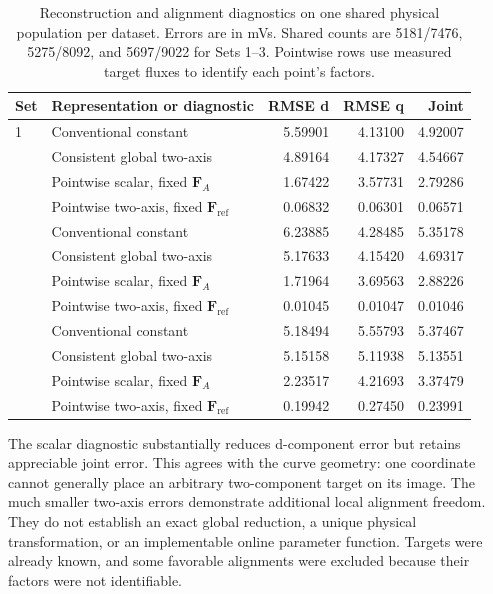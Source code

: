 \begin{table}[htbp]
\centering\small
\caption{Reconstruction and alignment diagnostics on one shared physical population per dataset. Errors are in mVs. Shared counts are 5181/7476, 5275/8092, and 5697/9022 for Sets 1--3. Pointwise rows use measured target fluxes to identify each point's factors.}
\label{tab:pointwise-comparison}
\begin{tabular}{llrrr}
\toprule
Set & Representation or diagnostic & RMSE d & RMSE q & Joint\\
\midrule
1 & Conventional constant & 5.59901 & 4.13100 & 4.92007\\
  & Consistent global two-axis & 4.89164 & 4.17327 & 4.54667\\
  & Pointwise scalar, fixed $\bm F_A$ & 1.67422 & 3.57731 & 2.79286\\
  & Pointwise two-axis, fixed $\bm F_{\mathrm{ref}}$ & 0.06832 & 0.06301 & 0.06571\\
\addlinespace
2 & Conventional constant & 6.23885 & 4.28485 & 5.35178\\
  & Consistent global two-axis & 5.17633 & 4.15420 & 4.69317\\
  & Pointwise scalar, fixed $\bm F_A$ & 1.71964 & 3.69563 & 2.88226\\
  & Pointwise two-axis, fixed $\bm F_{\mathrm{ref}}$ & 0.01045 & 0.01047 & 0.01046\\
\addlinespace
3 & Conventional constant & 5.18494 & 5.55793 & 5.37467\\
  & Consistent global two-axis & 5.15158 & 5.11938 & 5.13551\\
  & Pointwise scalar, fixed $\bm F_A$ & 2.23517 & 4.21693 & 3.37479\\
  & Pointwise two-axis, fixed $\bm F_{\mathrm{ref}}$ & 0.19942 & 0.27450 & 0.23991\\
\bottomrule
\end{tabular}
\end{table}

The scalar diagnostic substantially reduces d-component error but retains appreciable joint error. This agrees with the curve geometry: one coordinate cannot generally place an arbitrary two-component target on its image. The much smaller two-axis errors demonstrate additional local alignment freedom. They do not establish an exact global reduction, a unique physical transformation, or an implementable online parameter function. Targets were already known, and some favorable alignments were excluded because their factors were not identifiable.

